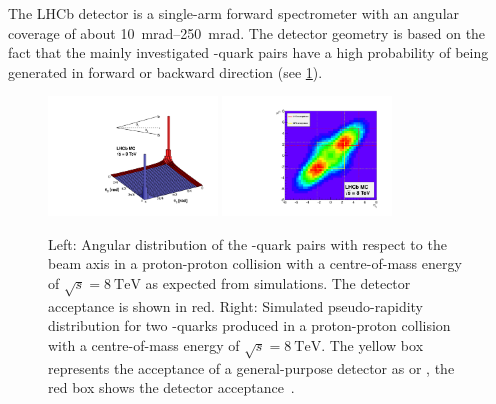 The LHCb detector is a single-arm forward spectrometer with an angular coverage of about \SIrange{10}{250}{\milli\radian}.
The detector geometry is based on the fact that the mainly investigated \bbbar-quark pairs have a high probability of being generated in forward or backward direction (see \cref{fig:anglePlots}).
\begin{figure}[tbp]
    \centering
    \includegraphics[width=0.4\textwidth]{05lhcb/figs/bbbarCorrelation_angle.pdf}
    \includegraphics[width=0.4\textwidth]{05lhcb/figs/bbbarCorrelation_rapidity.pdf}
    \caption{Left: Angular distribution of the \bbbar-quark pairs with respect to the beam axis in a proton-proton collision with a centre-of-mass energy of $\sqrt{s}=\SI{8}{\tera\electronvolt}$ as expected from simulations.
    The \lhcb detector acceptance is shown in red.
    Right: Simulated pseudo-rapidity distribution for two \bquark-quarks produced in a proton-proton collision with a centre-of-mass energy of $\sqrt{s}=\SI{8}{\tera\electronvolt}$.
    The yellow box represents the acceptance of a general-purpose detector as \cms or \atlas, the red box shows the \lhcb detector acceptance~\cite{angle_plots}.}
    \label{fig:anglePlots}
\end{figure}
